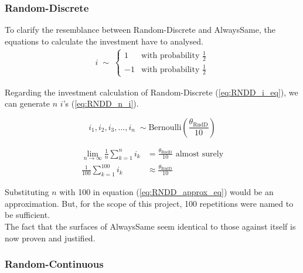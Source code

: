 \documentclass[11pt]{article}
\begin{document}
\subsubsection*{Random-Discrete}
		
	To clarify the resemblance between Random-Discrete and AlwaysSame, the equations to calculate the investment have to analysed.
	\begin{equation}
		\begin{split}
		i \;\sim\;
		\begin{cases}
		  1 & \text{with probability } \frac{1}{2}\\
		 -1 & \text{with probability } \frac{1}{2} 
		\end{cases}
		\label{eq:RNDD_i_eq}
		\end{split}
	\end{equation}

	Regarding the investment calculation of Random-Discrete (\ref{eq:RNDD_i_eq}), we can generate $n$ $i$'s (\ref{eq:RNDD_n_i}).

	\begin{equation}
		i_1, i_2, i_3, \dots, i_n \;\sim \mathrm{Bernoulli}(\frac{\theta_{\mathrm{RndD}}}{10})
		\label{eq:RNDD_n_i}
	\end{equation}

	\begin{equation}
		\begin{split}
			\lim_{n\to\infty} \frac{1}{n} \sum_{k=1}^{n} i_k &= \frac{\theta_{\mathrm{RndD}}}{10} \text{ almost surely}\\
			\frac{1}{100} \sum_{k=1}^{100} i_k &\approx \frac{\theta_{\mathrm{RndD}}}{10}
		\label{eq:RNDD_approx_eq}
		\end{split}
	\end{equation}

	Substituting $n$ with 100 in equation (\ref{eq:RNDD_approx_eq}) would be an approximation.
	But, for the scope of this project, 100 repetitions were named to be sufficient.\\
	The fact that the surfaces of AlwaysSame seem identical to those against itself is now proven and justified.
	
\subsubsection*{Random-Continuous}
\end{document}
